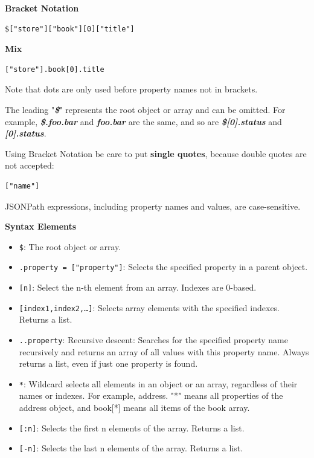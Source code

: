 \documentclass{article}
\newenvironment{blocktemplate}[1]{%
    \tcolorbox[beamer,%
    noparskip,breakable,
    colframe=Blue,%
    colbacklower=LimeGreen!75!LightGreen,%
    title=#1]}%
    {\endtcolorbox}
\newenvironment{blocktemplateII}[1]{%
    \tcolorbox[beamer,%
    noparskip,breakable,
    colframe=Green,%
    colbacklower=LimeGreen!75!LightGreen,%
    title=#1]}%
    {\endtcolorbox}
\newenvironment{blocktemplateIII}[1]{%
    \tcolorbox[beamer,%
    noparskip,breakable,
    ,colframe=Red,%
    colbacklower=LimeGreen!75!LightGreen,%
    title=#1]}%
    {\endtcolorbox}
\newenvironment{codetemplate}[1][]{%
  \mybasecolorbox[#1]
  \itshape
}{%
  \endmybasecolorbox
}
\begin{document}
\textbf{Bracket Notation}
\begin{codetemplate}{}
\begin{verbatim}
$["store"]["book"][0]["title"]
\end{verbatim}
\end{codetemplate}

\textbf{Mix}
\begin{codetemplate}{}
\begin{verbatim}
["store"].book[0].title
\end{verbatim}
\end{codetemplate}

\begin{blocktemplate}{Nota}
Note that dots are only used before property names not in brackets.
\end{blocktemplate}

\begin{blocktemplateII}{Nota 2}
The leading "\textbf{\textit{\$}}" represents the root object or array and can be omitted. For example, \textbf{\textit{\$.foo.bar}} and \textbf{\textit{foo.bar}} are the same, and so are \textbf{\textit{\$[0].status}} and \textbf{\textit{[0].status}}.
\end{blocktemplateII}

\begin{blocktemplateIII}{Nota 3}
Using Bracket Notation be care to put \textbf{single quotes}, because double quotes are not accepted:
\begin{verbatim}
["name"]
\end{verbatim}
\end{blocktemplateIII}

\begin{blocktemplateIII}{Nota 4}
JSONPath expressions, including property names and values, are case-sensitive.
\end{blocktemplateIII}

\textbf{Syntax Elements}
\begin{itemize}
    \item \verb|$|: The root object or array.
    \item \verb|.property = ["property"]|: Selects the specified property in a parent object.
    \item \verb|[n]|: Select the n-th element from an array. Indexes are 0-based.
    \item \verb|[index1,index2,…]|: Selects array elements with the specified indexes. Returns a list.
    \item \verb|..property|: Recursive descent: Searches for the specified property name recursively and returns an array of all values with this property name. Always returns a list, even if just one property is found.
    \item \verb|*|: Wildcard selects all elements in an object or an array, regardless of their names or indexes. For example, address. "*" means all properties of the address object, and book[*] means all items of the book array.
    \item \verb|[:n]|: Selects the first n elements of the array. Returns a list.
    \item \verb|[-n]|: Selects the last n elements of the array. Returns a list.
\end{itemize}
\end{document}
